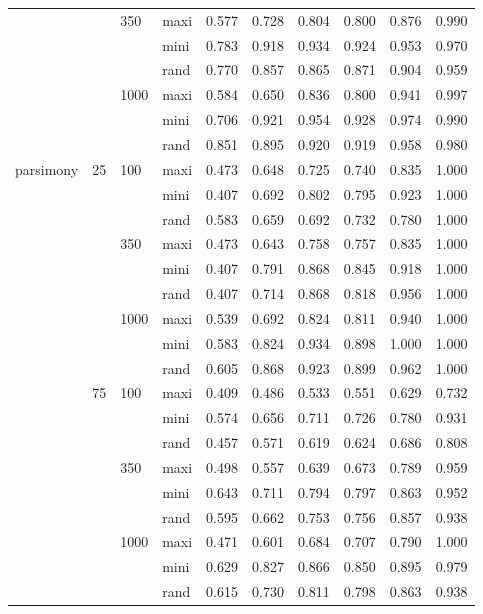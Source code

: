 \begin{table}[ht]
\begin{tabular}{llllrrrrrr}
   &  & 350 & maxi & 0.577 & 0.728 & 0.804 & 0.800 & 0.876 & 0.990 \\ 
   &  &  & mini & 0.783 & 0.918 & 0.934 & 0.924 & 0.953 & 0.970 \\ 
   &  &  & rand & 0.770 & 0.857 & 0.865 & 0.871 & 0.904 & 0.959 \\ 
   &  & 1000 & maxi & 0.584 & 0.650 & 0.836 & 0.800 & 0.941 & 0.997 \\ 
   &  &  & mini & 0.706 & 0.921 & 0.954 & 0.928 & 0.974 & 0.990 \\ 
   &  &  & rand & 0.851 & 0.895 & 0.920 & 0.919 & 0.958 & 0.980 \\ 
  parsimony & 25 & 100 & maxi & 0.473 & 0.648 & 0.725 & 0.740 & 0.835 & 1.000 \\ 
   &  &  & mini & 0.407 & 0.692 & 0.802 & 0.795 & 0.923 & 1.000 \\ 
   &  &  & rand & 0.583 & 0.659 & 0.692 & 0.732 & 0.780 & 1.000 \\ 
   &  & 350 & maxi & 0.473 & 0.643 & 0.758 & 0.757 & 0.835 & 1.000 \\ 
   &  &  & mini & 0.407 & 0.791 & 0.868 & 0.845 & 0.918 & 1.000 \\ 
   &  &  & rand & 0.407 & 0.714 & 0.868 & 0.818 & 0.956 & 1.000 \\ 
   &  & 1000 & maxi & 0.539 & 0.692 & 0.824 & 0.811 & 0.940 & 1.000 \\ 
   &  &  & mini & 0.583 & 0.824 & 0.934 & 0.898 & 1.000 & 1.000 \\ 
   &  &  & rand & 0.605 & 0.868 & 0.923 & 0.899 & 0.962 & 1.000 \\ 
   & 75 & 100 & maxi & 0.409 & 0.486 & 0.533 & 0.551 & 0.629 & 0.732 \\ 
   &  &  & mini & 0.574 & 0.656 & 0.711 & 0.726 & 0.780 & 0.931 \\ 
   &  &  & rand & 0.457 & 0.571 & 0.619 & 0.624 & 0.686 & 0.808 \\ 
   &  & 350 & maxi & 0.498 & 0.557 & 0.639 & 0.673 & 0.789 & 0.959 \\ 
   &  &  & mini & 0.643 & 0.711 & 0.794 & 0.797 & 0.863 & 0.952 \\ 
   &  &  & rand & 0.595 & 0.662 & 0.753 & 0.756 & 0.857 & 0.938 \\ 
   &  & 1000 & maxi & 0.471 & 0.601 & 0.684 & 0.707 & 0.790 & 1.000 \\ 
   &  &  & mini & 0.629 & 0.827 & 0.866 & 0.850 & 0.895 & 0.979 \\ 
   &  &  & rand & 0.615 & 0.730 & 0.811 & 0.798 & 0.863 & 0.938 \\ 

\end{tabular}
\end{table}
